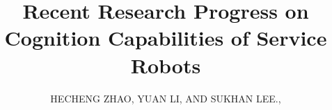 \documentclass{ieeeaccess}
\begin{document}
\history{}
\doi{}

\title{Recent Research Progress on Cognition Capabilities of Service Robots}
\author{\uppercase{Hecheng Zhao},
\uppercase{Yuan Li, and Sukhan Lee}.,
}
\address[1]{Intelligent System Research Institute (ISRI),
Sungkyunkwan University, 16419, Suwon, South Korea (e-mail: hczhao@skku.edu)}
\address[2]{Benewake Co., Ltd., Beijing, China (ly@benewake.com)}
\address[3]{Intelligent System Research Institute (ISRI),
Sungkyunkwan University, 16419, Suwon, South Korea (e-mail:
lsh@ece.skku.ac.kr)}


\end{document}
